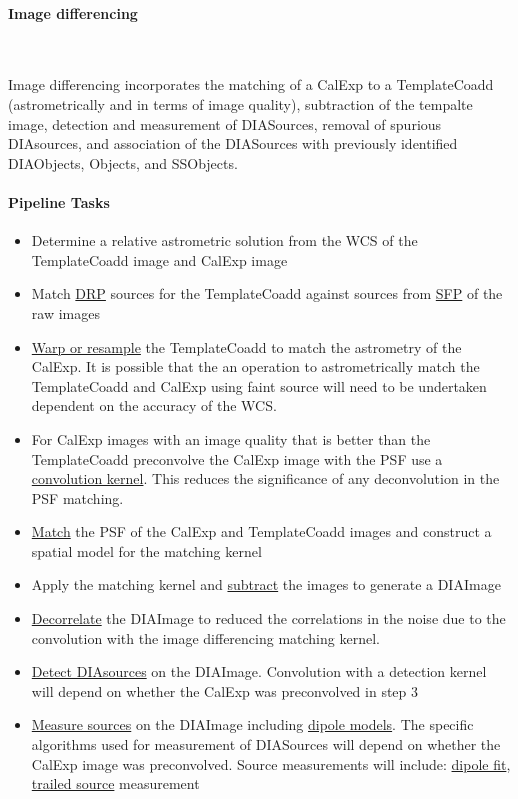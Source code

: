 \paragraph{Image differencing}~

Image differencing incorporates the matching of a CalExp to a TemplateCoadd (astrometrically and in terms of image quality), subtraction of the tempalte image, detection and measurement of DIASources, removal of spurious DIAsources, and association of the DIASources with previously identified DIAObjects, Objects, and SSObjects. 

\paragraph{Pipeline Tasks}
\begin{itemize}
\item Determine a relative astrometric solution from the WCS of the TemplateCoadd image and CalExp image
\item Match \hyperref[sec:apSourcemeasurement]{DRP} sources for the TemplateCoadd against sources from \hyperref[sec:apSingleFrameProcessing]{SFP} of the raw images 
\item \hyperref[sec:acWarping]{Warp or resample} the TemplateCoadd to match the astrometry of the CalExp. It is possible that the an operation to astrometrically match the TemplateCoadd and CalExp using faint source will need to be undertaken dependent on the accuracy of the WCS.
\item For CalExp images with an image quality that is better than the TemplateCoadd preconvolve the CalExp image with the PSF use a  \hyperref[sec:spKernels]{convolution kernel}. This reduces the significance of any deconvolution in the PSF matching.
\item \hyperref[sec:acDiffImDecorrelation]{Match} the PSF of the CalExp and TemplateCoadd images and construct a spatial model for the matching kernel
\item Apply the matching kernel and \hyperref[sec:acImageSubtraction]{subtract} the images to generate a DIAImage
\item \hyperref[sec:acDiffImDecorrelation]{Decorrelate} the DIAImage to reduced the correlations in the noise due to the convolution with the image differencing matching kernel. 
\item \hyperref[sec:acSourceDetection]{Detect DIAsources} on the DIAImage. Convolution with a detection kernel will depend on whether the CalExp was preconvolved in step 3
\item \hyperref[sec:acDiffImMeasurement]{ Measure sources} on the DIAImage including \hyperref[sec:acDipoleModels]{dipole models}. The specific algorithms used for measurement of DIASources will depend on whether the CalExp image was preconvolved.  Source measurements will include: \hyperref[sec:acDipoleModels]{dipole fit}, \hyperref[sec:acTrailedPointSourceModels]{trailed source} measurement

\end{itemize}

